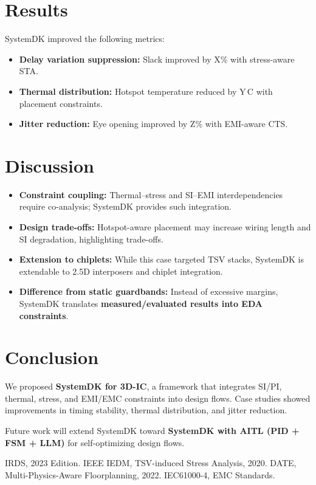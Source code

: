 \documentclass[conference]{IEEEtran}
\begin{document}
\section{Results}
SystemDK improved the following metrics:
\begin{itemize}
  \item \textbf{Delay variation suppression:} Slack improved by X\% with stress-aware STA.
  \item \textbf{Thermal distribution:} Hotspot temperature reduced by Y\,\textdegree C with placement constraints.
  \item \textbf{Jitter reduction:} Eye opening improved by Z\% with EMI-aware CTS.
\end{itemize}

\section{Discussion}
\begin{itemize}
  \item \textbf{Constraint coupling:} Thermal--stress and SI--EMI interdependencies require co-analysis; SystemDK provides such integration.
  \item \textbf{Design trade-offs:} Hotspot-aware placement may increase wiring length and SI degradation, highlighting trade-offs.
  \item \textbf{Extension to chiplets:} While this case targeted TSV stacks, SystemDK is extendable to 2.5D interposers and chiplet integration.
  \item \textbf{Difference from static guardbands:} Instead of excessive margins, SystemDK translates \textbf{measured/evaluated results into EDA constraints}.
\end{itemize}

\section{Conclusion}
We proposed \textbf{SystemDK for 3D-IC}, a framework that integrates SI/PI, thermal, stress, and EMI/EMC constraints into design flows.
Case studies showed improvements in timing stability, thermal distribution, and jitter reduction.

Future work will extend SystemDK toward \textbf{SystemDK with AITL (PID + FSM + LLM)} for self-optimizing design flows.

\begin{thebibliography}{1}
 IRDS, 2023 Edition.
 IEEE IEDM, TSV-induced Stress Analysis, 2020.
 DATE, Multi-Physics-Aware Floorplanning, 2022.
 IEC61000-4, EMC Standards.
\end{thebibliography}
\end{document}
